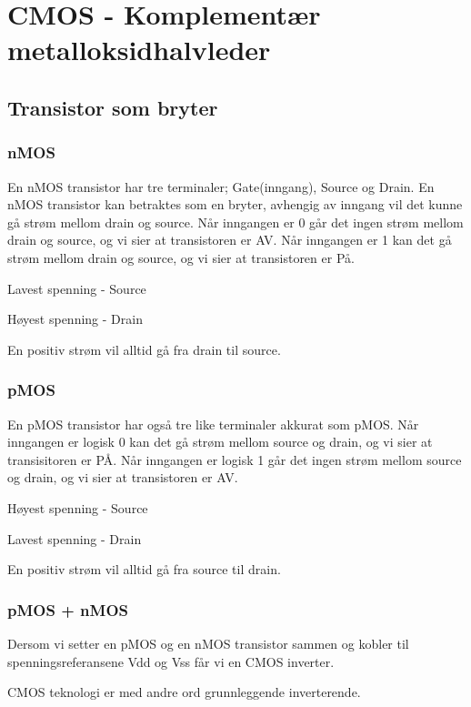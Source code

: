 \documentclass{article}
\begin{document}
	
	\section{CMOS - Komplementær metalloksidhalvleder}
	
	\subsection{Transistor som bryter}
	\subsubsection{nMOS}
	En nMOS transistor har tre terminaler; Gate(inngang), Source og Drain. En nMOS transistor kan betraktes som en bryter, avhengig av inngang vil det kunne gå strøm mellom drain og source. Når inngangen er 0 går det ingen strøm mellom drain og source, og vi sier at transistoren er AV. Når inngangen er 1 kan det gå strøm mellom drain og source, og vi sier at transistoren er På.
	
	Lavest spenning - Source
	
	Høyest spenning - Drain
	
	En positiv strøm vil alltid gå fra drain til source.
	
	\subsubsection{pMOS}
	
	En pMOS transistor har også tre like terminaler akkurat som pMOS. Når inngangen er logisk 0 kan det gå strøm mellom source og drain, og vi sier at transisitoren er PÅ. Når inngangen er logisk 1 går det ingen strøm mellom source og drain, og vi sier at transistoren er AV.
	
	Høyest spenning - Source
	
	Lavest spenning - Drain
	
	En positiv strøm vil alltid gå fra source til drain.
	
	\subsubsection{pMOS + nMOS}
	
	Dersom vi setter en pMOS og en nMOS transistor sammen og kobler til spenningsreferansene Vdd og Vss får vi en CMOS inverter.
	
	CMOS teknologi er med andre ord grunnleggende inverterende.
	
\end{document}
